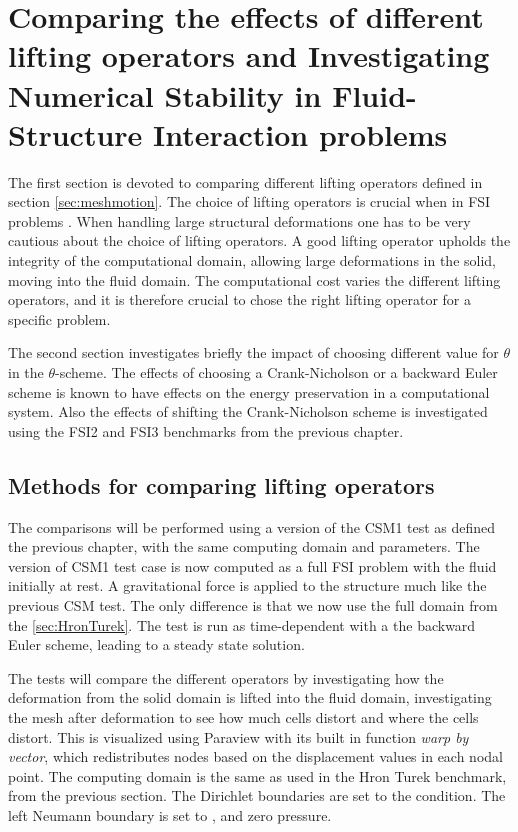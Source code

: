 \chapter{Comparing the effects of different lifting operators and Investigating Numerical Stability in Fluid-Structure Interaction problems}\label{sec:mesh_motion}
The first section is devoted to comparing different lifting operators defined in section \ref{sec:meshmotion}. The choice of lifting operators is crucial when in FSI problems \cite{Stein2003}. When handling large structural deformations one has to be very cautious about the choice of lifting operators. A good lifting operator upholds the integrity of the computational domain, allowing large deformations in the solid, moving into the fluid domain. The computational cost varies the different lifting operators, and it is therefore crucial to chose the right lifting operator for a specific problem. 

The second section investigates briefly the impact of choosing different value for $\theta$ in the $\theta$-scheme. The effects of choosing a Crank-Nicholson or a backward Euler scheme is known to have effects on the energy preservation in a computational system. Also the effects of shifting the Crank-Nicholson scheme is investigated using the FSI2 and FSI3 benchmarks from the previous chapter.
\section{Methods for comparing lifting operators}
The comparisons will be performed using a version of the CSM1 test as defined the previous chapter, with the same computing domain and parameters. The version of CSM1 test case is now computed as a full FSI problem with the fluid initially at rest. A gravitational force is applied to the structure much like the previous CSM test. The only difference is that we now use the full domain from the \ref{sec:HronTurek}. The test is run as time-dependent with a the backward Euler scheme, leading to a steady state solution.

The tests will compare the different operators by investigating how the deformation from the solid domain is lifted into the fluid domain, investigating the mesh after deformation to see how much cells distort and where the cells distort. This is visualized using Paraview with its built in function \textit{warp by vector}, which redistributes nodes based on the displacement values in each nodal point.
The computing domain is the same as used in the Hron Turek benchmark, from the previous section.
The Dirichlet boundaries are set to the  condition. The left Neumann boundary is set to , and zero pressure. \newline

